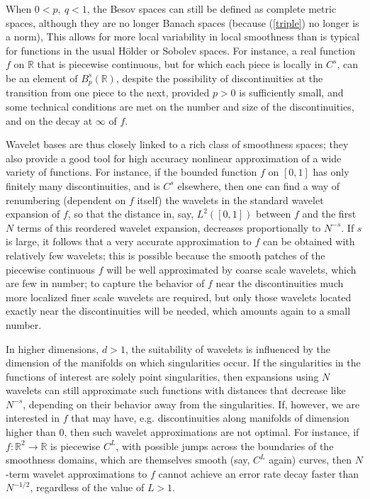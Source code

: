 \documentclass[10pt]{article}
\def\R{\mathbb{R}}
\begin{document}
When $0<p,~q<1$, the Besov spaces can still be defined as complete metric spaces,
although they are no longer Banach spaces (because (\ref{triple}) no longer is a norm),
This allows for more local variability in local smoothness than
is typical for functions
in  the usual H\"older
or Sobolev spaces. For instance, a real function $f$ on $\R$ that is piecewise
continuous, but for which each piece is locally in $C^s$, can be an element of
$B^s_p(\R)$, despite the possibility of discontinuities at the
transition from one piece to
the next, provided $p>0$ is sufficiently small, and
some technical conditions are met on the number and
size of the discontinuities, and on the decay at $\infty$ of $f$. 

Wavelet bases are thus closely linked to a rich class
of smoothness spaces; they also provide a good tool for high accuracy
nonlinear approximation of a wide variety of functions.  
For instance, if the bounded function $f$
on $[0,1]$ has only finitely many discontinuities, and is $C^s$ elsewhere,
then one can find a way of renumbering (dependent on $f$ itself)
the wavelets in the standard wavelet
expansion of $f$, so that the distance in, say, $L^2([0,1])$ between $f$
and the first $N$ terms of this reordered wavelet expansion, decreases
proportionally to $N^{-s}$.
If $s$ is large, it follows that  a very accurate approximation to $f$ can be
obtained with relatively few wavelets; this
is possible because
the smooth patches of the piecewise continuous
$f$  will be well approximated by coarse scale wavelets, which are 
few in number; to capture the behavior of $f$ near 
the discontinuities  much more localized
finer scale wavelets are required, but only 
those wavelets located exactly near
the discontinuities will be needed, which amounts
again to a small number. 

In higher dimensions, $d > 1$,  the suitability of wavelets
is influenced by the
dimension of the manifolds on which singularities occur. If the
singularities in the
functions of interest are solely point singularities, then expansions
using $N$ wavelets can still approximate such functions with distances that
decrease like $N^{-s}$,
depending on their behavior away
from the
singularities. If, however, we are interested in $f$ that may have, e.g.
discontinuities
along manifolds of dimension higher than 0, then such wavelet
approximations  are not optimal.
For instance, if $f:\R^2 \rightarrow \R$ is piecewise $C^L$, with
possible jumps across the
boundaries of the smoothness domains, which are themselves smooth
(say, $C^L$ again) curves,
then $N$-term wavelet approximations  to $f$ cannot achieve an error
rate decay faster than $N^{-1/2}$,
regardless of the
value of $L>1$. 
\end{document}
